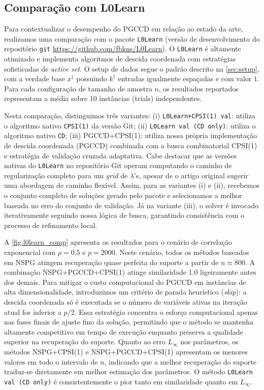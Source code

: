 \subsection{Comparação com L0Learn}
Para contextualizar o desempenho do PGCCD em relação ao estado da arte, realizamos uma comparação com o pacote \texttt{L0Learn} \cite{l0learn} (versão de desenvolvimento do repositório \texttt{git} \url{https://github.com/fbkns/L0Learn}). O \texttt{L0Learn} é altamente otimizado e implementa algoritmos de descida coordenada com estratégias sofisticadas de \textit{active set}. O setup de dados segue o padrão descrito na \autoref{sec:setup}, com a verdade base $x^\dagger$ possuindo $k^\dagger$ entradas igualmente espaçadas e com valor $1$. Para cada configuração de tamanho de amostra $n$, os resultados reportados representam a média sobre 10 instâncias (trials) independentes.

Nesta comparação, distinguimos três variantes:
(i) \texttt{L0Learn+CPSI(1) val}: utiliza o algoritmo nativo \texttt{CPSI(1)} da versão Git;
(ii) \texttt{L0Learn val (CD only)}: utiliza o algoritmo nativo \texttt{CD};
(iii) PGCCD+CPSI(1): utiliza nossa própria implementação de descida coordenada (PGCCD) combinada com a busca combinatorial CPSI(1) e estratégia de validação cruzada adaptativa.
Cabe destacar que as versões nativas do \texttt{L0Learn} no repositório Git operam computando o caminho de regularização completo para um \textit{grid} de $\lambda$'s, apesar de o artigo original sugerir uma abordagem de caminho flexível. Assim, para as variantes (i) e (ii), recebemos o conjunto completo de soluções gerado pelo pacote e selecionamos a melhor baseada no erro do conjunto de validação. Já na variante (iii), o solver é invocado iterativamente seguindo nossa lógica de busca, garantindo consistência com o processo de refinamento local.

A \autoref{fig:l0learn_comp} apresenta os resultados para o cenário de correlação exponencial com $\rho=0.5$ e $p=2000$. Neste cenário, todos os métodos baseados em NSPG atingem recuperação quase perfeita do suporte a partir de $n \approx 800$. A combinação NSPG+PGCCD+CPSI(1) atinge similaridade 1.0 ligeiramente antes dos demais. Para mitigar o custo computacional do PGCCD em instâncias de alta dimensionalidade, introduzimos um critério de parada heurístico (\textit{skip}): a descida coordenada só é executada se o número de variáveis ativas na iteração atual for inferior a $p/2$. Essa estratégia concentra o esforço computacional apenas nas fases finais de ajuste fino da solução, permitindo que o método se mantenha altamente competitivo em tempo de execução enquanto preserva a qualidade superior na recuperação do suporte. Quanto ao erro $L_\infty$ nos parâmetros, os métodos NSPG+CPSI(1) e NSPG+PGCCD+CPSI(1) apresentam os menores valores em todo o intervalo de $n$, indicando que a melhor recuperação do suporte traduz-se diretamente em melhor estimação dos parâmetros. O método \texttt{L0Learn val (CD only)} é consistentemente o pior tanto em similaridade quanto em $L_\infty$.

